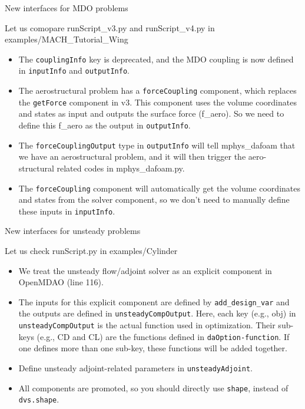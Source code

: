 \documentclass{bredelebeamer}
\begin{document}
\begin{frame}{New interfaces for MDO problems}

  Let us comopare runScript\_v3.py and runScript\_v4.py in examples/MACH\_Tutorial\_Wing
  
  \begin{itemize}
  
    \item The \texttt{couplingInfo} key is deprecated, and the MDO coupling is now defined in \texttt{inputInfo} and \texttt{outputInfo}.
    \item The aerostructural problem has a \texttt{forceCoupling} component, which replaces the \texttt{getForce} component in v3. This component uses the volume coordinates and states as input and outputs the surface force (f\_aero). So we need to define this f\_aero as the output in \texttt{outputInfo}. 
    \item The \texttt{forceCouplingOutput} type in \texttt{outputInfo} will tell mphys\_dafoam that we have an aerostructural problem, and it will then trigger the aero-structural related codes in mphys\_dafoam.py.
    \item The \texttt{forceCoupling} component will automatically get the volume coordinates and states from the solver component, so we don't need to manually define these inputs in \texttt{inputInfo}.
    
    
\end{itemize}
\end{frame}

\begin{frame}{New interfaces for unsteady problems}

   Let us check runScript.py in examples/Cylinder
  
  \begin{itemize}
  \item We treat the unsteady flow/adjoint solver as an explicit component in OpenMDAO (line 116).
  \item The inputs for this explicit component are defined by \texttt{add\_design\_var} and the outputs are defined in \texttt{unsteadyCompOutput}. Here, each key (e.g., obj) in \texttt{unsteadyCompOutput} is the actual function used in optimization. Their sub-keys (e.g., CD and CL) are the functions defined in \texttt{daOption-function}. If one defines more than one sub-key, these functions will be added together.  
   \item Define unsteady adjoint-related parameters in \texttt{unsteadyAdjoint}.
   \item All components are promoted, so you should directly use \texttt{shape}, instead of \texttt{dvs.shape}.
    
\end{itemize}
\end{frame}
\end{document}
